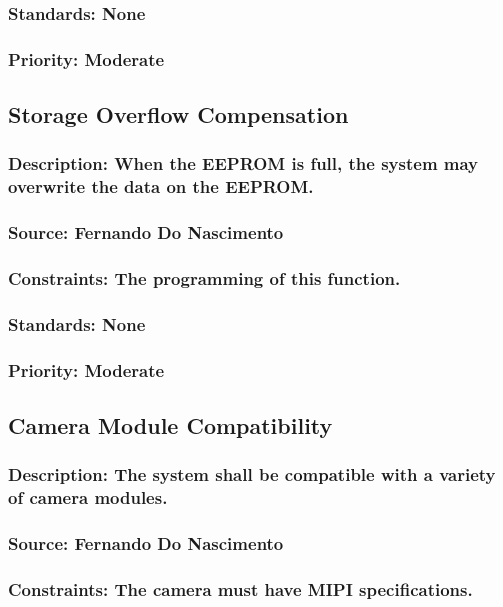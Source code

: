 \subsubsection{Standards: None}
\subsubsection{Priority: Moderate}

\subsection{Storage Overflow Compensation}
\subsubsection{Description: When the EEPROM is full, the system may overwrite the data on the EEPROM.}
\subsubsection{Source: Fernando Do Nascimento}
\subsubsection{Constraints: The programming of this function.}
\subsubsection{Standards: None}
\subsubsection{Priority: Moderate}

\subsection{Camera Module Compatibility}
\subsubsection{Description: The system shall be compatible with a variety of camera modules.}
\subsubsection{Source: Fernando Do Nascimento}
\subsubsection{Constraints: The camera must have MIPI specifications.}
